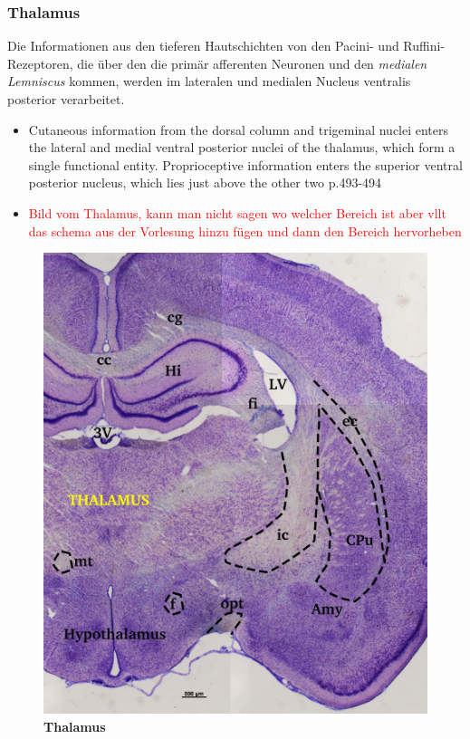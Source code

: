 \documentclass[12pt,a4paper,pdftex]{article}
\begin{document}
\subsubsection*{Thalamus}
Die Informationen aus den tieferen Hautschichten von den Pacini- und Ruffini- Rezeptoren, die über den die primär afferenten Neuronen und den \textit{medialen Lemniscus} kommen, werden im lateralen und medialen Nucleus ventralis posterior verarbeitet. 

\begin{itemize}
    \item Cutaneous information from the dorsal column
    and trigeminal nuclei enters the lateral and medial
    ventral posterior nuclei of the thalamus, which form
    a single functional entity. Proprioceptive information
    enters the superior ventral posterior nucleus, which
    lies just above the other two \cite{kandel2013principles} p.493-494
    \item \textcolor{red}{Bild vom Thalamus, kann man nicht sagen wo welcher Bereich ist aber vllt das schema aus der Vorlesung hinzu fügen und dann den Bereich hervorheben}
\end{itemize}

\begin{figure}[H]
    \centering
    \includegraphics{pictures/somatosensory/thalamus_somato.png}
    \caption[Thalamus]{\textbf{Thalamus}}
    \label{fig:thalamus_somato}
\end{figure}
\end{document}
